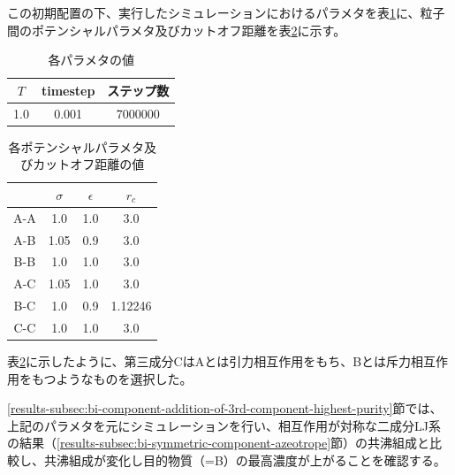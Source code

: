 \documentclass[titlepage]{jsreport}
\begin{document}
\newpage
この初期配置の下、実行したシミュレーションにおけるパラメタを表\ref{table:bi-component-addition-of-3rd-component-parameter}に、粒子間のポテンシャルパラメタ及びカットオフ距離を表\ref{table:bi-component-addition-of-3rd-component-potential-parameter}に示す。

\begin{table}[htbp]
    \begin{center}
        \caption{各パラメタの値}
        \label{table:bi-component-addition-of-3rd-component-parameter}
        \begin{tabular}{c c c}
            $T$ & timestep & ステップ数 \\
            \hline
            1.0 & 0.001 & 7000000 \\
        \end{tabular}
    \end{center}
\end{table}

\begin{table}[htbp]
    \begin{center}
        \caption{各ポテンシャルパラメタ及びカットオフ距離の値}
        \label{table:bi-component-addition-of-3rd-component-potential-parameter}
        \begin{tabular}{c c c c}
            & $\sigma$ & $\epsilon$ & $r_c$ \\
            \hline
            A-A & 1.0 & 1.0 & 3.0 \\
            A-B & 1.05 & 0.9 & 3.0 \\
            B-B & 1.0 & 1.0 & 3.0 \\
            A-C & 1.05 & 1.0 & 3.0 \\
            B-C & 1.0 & 0.9 & 1.12246 \\
            C-C & 1.0 & 1.0 & 3.0
        \end{tabular}
    \end{center}
\end{table}

表\ref{table:bi-component-addition-of-3rd-component-potential-parameter}に示したように、第三成分CはAとは引力相互作用をもち、Bとは斥力相互作用をもつようなものを選択した。

\ref{results-subsec:bi-component-addition-of-3rd-component-highest-purity}節では、上記のパラメタを元にシミュレーションを行い、相互作用が対称な二成分LJ系の結果（\ref{results-subsec:bi-symmetric-component-azeotrope}節）の共沸組成と比較し、共沸組成が変化し目的物質（=B）の最高濃度が上がることを確認する。
\end{document}
